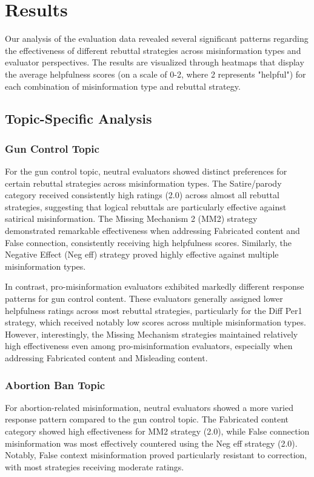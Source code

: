 \documentclass[twocolumn]{article}
\begin{document}
\section{Results}
Our analysis of the evaluation data revealed several significant patterns regarding the effectiveness of different rebuttal strategies across misinformation types and evaluator perspectives. The results are visualized through heatmaps that display the average helpfulness scores (on a scale of 0-2, where 2 represents "helpful") for each combination of misinformation type and rebuttal strategy.

\subsection{Topic-Specific Analysis}
\subsubsection{Gun Control Topic}
For the gun control topic, neutral evaluators showed distinct preferences for certain rebuttal strategies across misinformation types. The Satire/parody category received consistently high ratings (2.0) across almost all rebuttal strategies, suggesting that logical rebuttals are particularly effective against satirical misinformation. The Missing Mechanism 2 (MM2) strategy demonstrated remarkable effectiveness when addressing Fabricated content and False connection, consistently receiving high helpfulness scores. Similarly, the Negative Effect (Neg eff) strategy proved highly effective against multiple misinformation types.

In contrast, pro-misinformation evaluators exhibited markedly different response patterns for gun control content. These evaluators generally assigned lower helpfulness ratings across most rebuttal strategies, particularly for the Diff Per1 strategy, which received notably low scores across multiple misinformation types. However, interestingly, the Missing Mechanism strategies maintained relatively high effectiveness even among pro-misinformation evaluators, especially when addressing Fabricated content and Misleading content.

\subsubsection{Abortion Ban Topic}
For abortion-related misinformation, neutral evaluators showed a more varied response pattern compared to the gun control topic. The Fabricated content category showed high effectiveness for MM2 strategy (2.0), while False connection misinformation was most effectively countered using the Neg eff strategy (2.0). Notably, False context misinformation proved particularly resistant to correction, with most strategies receiving moderate ratings.
\end{document}

